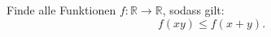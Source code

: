 Finde alle Funktionen $f\colon\mathbb{R} \rightarrow \mathbb{R}$, sodass gilt:
\[
f(xy) \leq f(x+y).
\]
